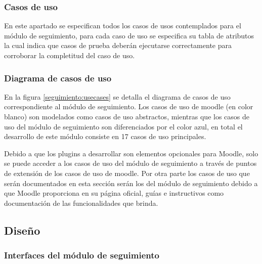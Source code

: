 \subsubsection{Casos de uso} %

 En este apartado se especifican todos los casos de usos contemplados para el módulo de
seguimiento, para cada caso de uso se especifica su tabla de atributos la cual indica que casos
 de prueba deberán ejecutarse correctamente para corroborar la completitud del caso de uso.

\subsubsection*{Diagrama de casos de uso}

 En la figura \ref{seguimiento:usecases} se detalla el diagrama de casos de uso correspondiente al módulo
 de seguimiento. Los casos de uso de moodle (en color blanco) son modelados como casos de uso
 abstractos, mientras que los casos de uso del módulo de seguimiento son diferenciados por el
 color azul, en total el desarrollo de este módulo consiste en 17 casos de uso principales.


 \noindent
 Debido a que los plugins a desarrollar son elementos opcionales para Moodle, solo se puede
 acceder a los casos de uso del módulo de seguimiento a través de puntos de extensión de los
 casos de uso de moodle. Por otra parte los casos de uso que serán documentados en esta sección
 serán los del módulo de seguimiento debido a que Moodle proporciona en su página oficial, guías
 e instructivos como documentación de las funcionalidades que brinda.








\clearpage
\subsection{Diseño}

\subsubsection{Interfaces del módulo de seguimiento}

